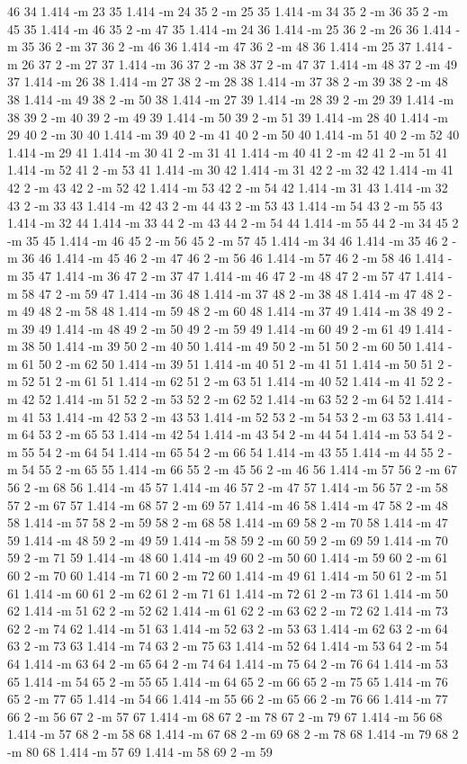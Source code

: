 \documentclass[12pt]{article}
\begin{document}
46 34 1.414 -m 23 35 1.414 -m 24 35 2 -m 25 35 1.414 -m 34 35 2 -m 36 35 2 -m 45 35 1.414 -m 46 35 2 -m 47 35 1.414 -m 24 36 1.414 -m 25 36 2 -m 26 36 1.414 -m 35 36 2 -m 37 36 2 -m 46 36 1.414 -m 47 36 2 -m 48 36 1.414 -m 25 37 1.414 -m 26 37 2 -m 27 37 1.414 -m 36 37 2 -m 38 37 2 -m 47 37 1.414 -m 48 37 2 -m 49 37 1.414 -m 26 38 1.414 -m 27 38 2 -m 28 38 1.414 -m 37 38 2 -m 39 38 2 -m 48 38 1.414 -m 49 38 2 -m 50 38 1.414 -m 27 39 1.414 -m 28 39 2 -m 29 39 1.414 -m 38 39 2 -m 40 39 2 -m 49 39 1.414 -m 50 39 2 -m 51 39 1.414 -m 28 40 1.414 -m 29 40 2 -m 30 40 1.414 -m 39 40 2 -m 41 40 2 -m 50 40 1.414 -m 51 40 2 -m 52 40 1.414 -m 29 41 1.414 -m 30 41 2 -m 31 41 1.414 -m 40 41 2 -m 42 41 2 -m 51 41 1.414 -m 52 41 2 -m 53 41 1.414 -m 30 42 1.414 -m 31 42 2 -m 32 42 1.414 -m 41 42 2 -m 43 42 2 -m 52 42 1.414 -m 53 42 2 -m 54 42 1.414 -m 31 43 1.414 -m 32 43 2 -m 33 43 1.414 -m 42 43 2 -m 44 43 2 -m 53 43 1.414 -m 54 43 2 -m 55 43 1.414 -m 32 44 1.414 -m 33 44 2 -m 43 44 2 -m 54 44 1.414 -m 55 44 2 -m 34 45 2 -m 35 45 1.414 -m 46 45 2 -m 56 45 2 -m 57 45 1.414 -m 34 46 1.414 -m 35 46 2 -m 36 46 1.414 -m 45 46 2 -m 47 46 2 -m 56 46 1.414 -m 57 46 2 -m 58 46 1.414 -m 35 47 1.414 -m 36 47 2 -m 37 47 1.414 -m 46 47 2 -m 48 47 2 -m 57 47 1.414 -m 58 47 2 -m 59 47 1.414 -m 36 48 1.414 -m 37 48 2 -m 38 48 1.414 -m 47 48 2 -m 49 48 2 -m 58 48 1.414 -m 59 48 2 -m 60 48 1.414 -m 37 49 1.414 -m 38 49 2 -m 39 49 1.414 -m 48 49 2 -m 50 49 2 -m 59 49 1.414 -m 60 49 2 -m 61 49 1.414 -m 38 50 1.414 -m 39 50 2 -m 40 50 1.414 -m 49 50 2 -m 51 50 2 -m 60 50 1.414 -m 61 50 2 -m 62 50 1.414 -m 39 51 1.414 -m 40 51 2 -m 41 51 1.414 -m 50 51 2 -m 52 51 2 -m 61 51 1.414 -m 62 51 2 -m 63 51 1.414 -m 40 52 1.414 -m 41 52 2 -m 42 52 1.414 -m 51 52 2 -m 53 52 2 -m 62 52 1.414 -m 63 52 2 -m 64 52 1.414 -m 41 53 1.414 -m 42 53 2 -m 43 53 1.414 -m 52 53 2 -m 54 53 2 -m 63 53 1.414 -m 64 53 2 -m 65 53 1.414 -m 42 54 1.414 -m 43 54 2 -m 44 54 1.414 -m 53 54 2 -m 55 54 2 -m 64 54 1.414 -m 65 54 2 -m 66 54 1.414 -m 43 55 1.414 -m 44 55 2 -m 54 55 2 -m 65 55 1.414 -m 66 55 2 -m 45 56 2 -m 46 56 1.414 -m 57 56 2 -m 67 56 2 -m 68 56 1.414 -m 45 57 1.414 -m 46 57 2 -m 47 57 1.414 -m 56 57 2 -m 58 57 2 -m 67 57 1.414 -m 68 57 2 -m 69 57 1.414 -m 46 58 1.414 -m 47 58 2 -m 48 58 1.414 -m 57 58 2 -m 59 58 2 -m 68 58 1.414 -m 69 58 2 -m 70 58 1.414 -m 47 59 1.414 -m 48 59 2 -m 49 59 1.414 -m 58 59 2 -m 60 59 2 -m 69 59 1.414 -m 70 59 2 -m 71 59 1.414 -m 48 60 1.414 -m 49 60 2 -m 50 60 1.414 -m 59 60 2 -m 61 60 2 -m 70 60 1.414 -m 71 60 2 -m 72 60 1.414 -m 49 61 1.414 -m 50 61 2 -m 51 61 1.414 -m 60 61 2 -m 62 61 2 -m 71 61 1.414 -m 72 61 2 -m 73 61 1.414 -m 50 62 1.414 -m 51 62 2 -m 52 62 1.414 -m 61 62 2 -m 63 62 2 -m 72 62 1.414 -m 73 62 2 -m 74 62 1.414 -m 51 63 1.414 -m 52 63 2 -m 53 63 1.414 -m 62 63 2 -m 64 63 2 -m 73 63 1.414 -m 74 63 2 -m 75 63 1.414 -m 52 64 1.414 -m 53 64 2 -m 54 64 1.414 -m 63 64 2 -m 65 64 2 -m 74 64 1.414 -m 75 64 2 -m 76 64 1.414 -m 53 65 1.414 -m 54 65 2 -m 55 65 1.414 -m 64 65 2 -m 66 65 2 -m 75 65 1.414 -m 76 65 2 -m 77 65 1.414 -m 54 66 1.414 -m 55 66 2 -m 65 66 2 -m 76 66 1.414 -m 77 66 2 -m 56 67 2 -m 57 67 1.414 -m 68 67 2 -m 78 67 2 -m 79 67 1.414 -m 56 68 1.414 -m 57 68 2 -m 58 68 1.414 -m 67 68 2 -m 69 68 2 -m 78 68 1.414 -m 79 68 2 -m 80 68 1.414 -m 57 69 1.414 -m 58 69 2 -m 59 
\end{document}
